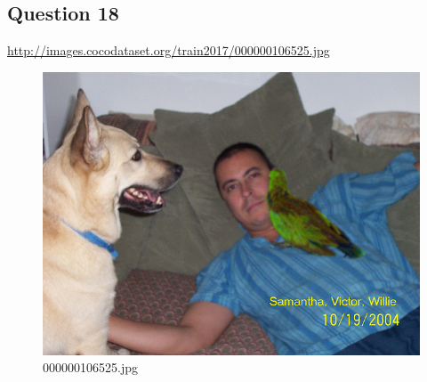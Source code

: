 \subsection*{Question 18}
\url{http://images.cocodataset.org/train2017/000000106525.jpg}
    \begin{figure}[h]
        \centering
        \includegraphics[width=0.8\linewidth]{../image set/easy/000000106525.jpg}
        \caption{000000106525.jpg}
    \end{figure}
